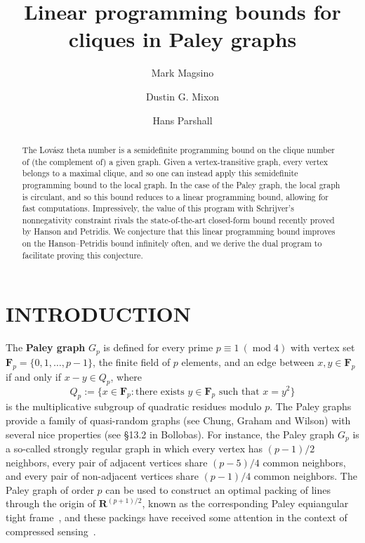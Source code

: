 \documentclass[]{spie}  %
\title{Linear programming bounds for cliques in Paley graphs}
\author{Mark Magsino}
\author{Dustin G. Mixon}
\author{Hans Parshall}
\affil{Department of Mathematics, The Ohio State University, Columbus, OH 43201}
\begin{document}
 
\maketitle

\begin{abstract}
The Lov\'{a}sz theta number is a semidefinite programming bound on the clique number of (the complement of) a given graph.
Given a vertex-transitive graph, every vertex belongs to a maximal clique, and so one can instead apply this semidefinite programming bound to the local graph.
In the case of the Paley graph, the local graph is circulant, and so this bound reduces to a linear programming bound, allowing for fast computations.
Impressively, the value of this program with Schrijver's nonnegativity constraint rivals the state-of-the-art closed-form bound recently proved by Hanson and Petridis.
We conjecture that this linear programming bound improves on the Hanson--Petridis bound infinitely often, and we derive the dual program to facilitate proving this conjecture.
\end{abstract}


\section{INTRODUCTION}

The \textbf{Paley graph} $G_p$ is defined for every prime $p \equiv 1~(\operatorname{mod}4)$ with vertex set $\mathbf{F}_p = \{0, 1, \ldots, p - 1\}$, the finite field of $p$ elements, and an edge between $x,y \in \mathbf{F}_p$ if and only if $x - y \in Q_p$, where
\[
Q_p := \{x \in \mathbf{F}_p : \text{there exists } y \in \mathbf{F}_p \text{ such that } x = y^2\}
\]
is the multiplicative subgroup of quadratic residues modulo $p$.  The Paley graphs provide a family of quasi-random graphs (see Chung, Graham and Wilson\cite{chung89}) with several nice properties (see \S 13.2 in Bollobas\cite{bollobas01}).  For instance, the Paley graph $G_p$ is a so-called strongly regular graph in which every vertex has $(p - 1)/2$ neighbors, every pair of adjacent vertices share $(p - 5)/4$ common neighbors, and every pair of non-adjacent vertices share $(p - 1)/4$ common neighbors. 
The Paley graph of order $p$ can be used to construct an optimal packing of lines through the origin of $\mathbf{R}^{(p+1)/2}$, known as the corresponding Paley equiangular tight frame~\cite{strohmer03,renes07,waldron09}, and these packings have received some attention in the context of compressed sensing~\cite{bandeira13,bandeira17}.
\end{document}
